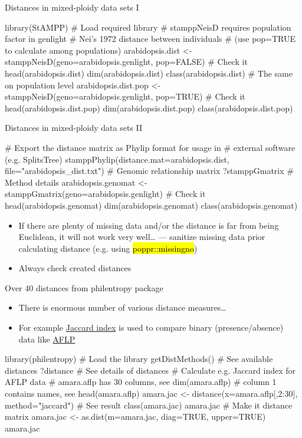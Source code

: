 \documentclass[compress, ucs, xelatex, 11pt, xcolor=svgnames,
	hyperref={
		bookmarks=true,
		unicode=true,
		colorlinks=true,
		pdftitle={Molecular data in R},
		plainpages=false,
		pdfauthor={Vojtech Zeisek},
		pdfsubject={Course about phylogeny and evolution in R},
		pdfcreator={XeLaTeX},
		pdfkeywords={R, evolution, phylogeny, molecular data},
		linkcolor=Tomato,
		anchorcolor=SaddleBrown,
		citecolor=Goldenrod,
		filecolor=DarkMagenta,
		menucolor=Sienna,
		urlcolor=DarkTurquoise,
		pdftex},
	url={hyphens, lowtilde} %
	]{beamer}
\renewcommand{\texttt}[1]{\hl{\ttfamily #1}}
\begin{document}
\begin{frame}[fragile]{Distances in mixed-ploidy data sets I}
	\begin{spluscode}
    library(StAMPP) # Load required library
    # stamppNeisD requires population factor in genlight
    # Nei's 1972 distance between individuals
    # (use pop=TRUE to calculate among populations)
    arabidopsis.dist <- stamppNeisD(geno=arabidopsis.genlight, pop=FALSE)
    # Check it
    head(arabidopsis.dist)
    dim(arabidopsis.dist)
    class(arabidopsis.dist)
    # The same on population level
    arabidopsis.dist.pop <- stamppNeisD(geno=arabidopsis.genlight, pop=TRUE)
    # Check it
    head(arabidopsis.dist.pop)
    dim(arabidopsis.dist.pop)
    class(arabidopsis.dist.pop)
	\end{spluscode}
\end{frame}

\begin{frame}[fragile]{Distances in mixed-ploidy data sets II}
	\begin{spluscode}
    # Export the distance matrix as Phylip format for usage in
    # external software (e.g. SplitsTree)
    stamppPhylip(distance.mat=arabidopsis.dist, file="arabidopsis_dist.txt")
    # Genomic relationship matrix
    ?stamppGmatrix # Method details
    arabidopsis.genomat <- stamppGmatrix(geno=arabidopsis.genlight)
    # Check it
    head(arabidopsis.genomat)
    dim(arabidopsis.genomat)
    class(arabidopsis.genomat)
	\end{spluscode}
	\begin{itemize}
		\item If there are plenty of missing data and/or the distance is far from being Euclidean, it will not work very well\ldots{ } --- sanitize missing data prior calculating distance (e.g. using \texttt{poppr::missingno})
		\item Always check created distances
	\end{itemize}
\end{frame}

\begin{frame}[fragile]{Over 40 distances from philentropy package}
	\begin{itemize}
		\item There is enormous number of various distance measures\ldots
		\item For example \href{https://en.wikipedia.org/wiki/Jaccard_index}{Jaccard index} is used to compare binary (presence/absence) data like \href{https://en.wikipedia.org/wiki/Amplified_fragment_length_polymorphism}{AFLP}
	\end{itemize}
	\begin{spluscode}
    library(philentropy) # Load the library
    getDistMethods() # See available distances
    ?distance # See details of distances
    # Calculate e.g. Jaccard index for AFLP data
    # amara.aflp has 30 columns, see dim(amara.aflp)
    # column 1 contains names, see head(amara.aflp)
    amara.jac <- distance(x=amara.aflp[,2:30], method="jaccard")
    # See result
    class(amara.jac)
    amara.jac
    # Make it distance matrix
    amara.jac <- as.dist(m=amara.jac, diag=TRUE, upper=TRUE)
    amara.jac
	\end{spluscode}
\end{frame}
\end{document}
